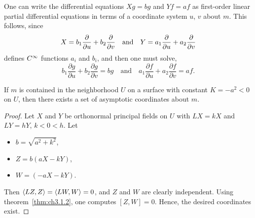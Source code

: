 \documentclass[../main]{subfiles}
\begin{document}
One can write the differential equations $Xg = bg$ and $Yf = af$ as first-order linear partial differential equations in terms of a coordinate system $u$, $v$ about $m$. This follows, since 
\begin{equation*}
   X = b_1 \dfrac{\partial }{\partial u}+b_2 \dfrac{\partial }{\partial v}\quad\text{and}\quad Y= a_1 \dfrac{\partial }{\partial u}+a_2\dfrac{\partial }{\partial v}
\end{equation*}
defines $C^\infty$ functions $a_i$ and $b_i$, and then one must solve,
\[ b_1\frac{\partial g}{\partial u} + b_2\frac{\partial g}{\partial v} = bg \quad\text{and}\quad a_1\frac{\partial f}{\partial u} + a_2\frac{\partial f}{\partial v} = af\text{.} \]



\begin{theorem} \label{thm:ch9.5.3}
    If $m$ is contained in the neighborhood $U$ on a surface with constant $K = -a^2 < 0$ on $U$, then there exists a set of asymptotic coordinates about $m$.
\end{theorem}

\begin{proof}
    Let $X$ and $Y$ be orthonormal principal fields on $U$ with $LX = kX$ and $LY = hY$, $k < 0 < h$. Let
    \begin{itemize}
        \item $b=\sqrt{a^2+k^2}$,
        \item $Z=b(aX-kY)$,
        \item $W=(-aX-kY)$.
    \end{itemize}
    Then $\left\langle LZ,Z\right\rangle = \left\langle LW,W\right\rangle = 0$, and $Z$ and $W$ are clearly independent. Using theorem~\ref{thm:ch3.1.2}, one computes $[Z,W] = 0$. Hence, the desired coordinates exist.
\end{proof}
\end{document}
